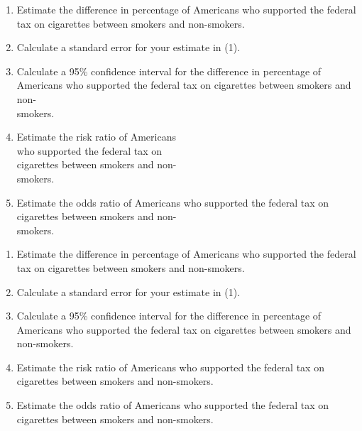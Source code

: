 \documentclass[11pt, chapterprefix=true]{scrbook}\usepackage[]{graphicx}\usepackage[]{color}
\begin{document}
\begin{exercises}
\begin{exercise}
	  \begin{enumerate}
	  \item Estimate the difference in percentage of Americans who supported the federal \\ tax on cigarettes between smokers and non-smokers.
    \item Calculate a standard error for your estimate in (1).
    \item Calculate a 95\% confidence interval for the difference in percentage of Americans who supported the federal tax on cigarettes between smokers and non- \\ smokers.
    \item Estimate the risk ratio of Americans \\ who supported the federal tax on \\ cigarettes between smokers and non- \\ smokers.
    \item Estimate the odds ratio of Americans who supported the federal tax on \\ cigarettes between smokers and non- \\ smokers.
	  \end{enumerate}

	\end{exercise}
	\begin{solution}  %

		  \begin{enumerate}
	  \item Estimate the difference in percentage of Americans who supported the federal tax on cigarettes between smokers and non-smokers.
    \item Calculate a standard error for your estimate in (1).
    \item Calculate a 95\% confidence interval for the difference in percentage of Americans who supported the federal tax on cigarettes between smokers and non-smokers.
    \item Estimate the risk ratio of Americans who supported the federal tax on cigarettes between smokers and non-smokers.
    \item Estimate the odds ratio of Americans who supported the federal tax on cigarettes between smokers and non-smokers.
	  \end{enumerate}

   	\end{solution}

  \begin{exercise} %


\end{exercise}
\end{exercises}
\end{document}
